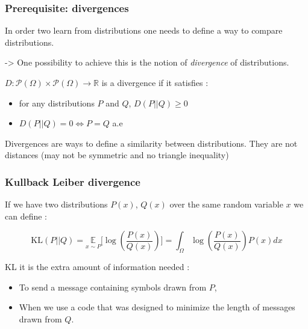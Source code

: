 \documentclass[french,9pt]{beamer}
\begin{document}


\begin{frame}
\frametitle{Prerequisite: divergences}

In order two learn from distributions one needs to define a way to compare distributions. 

-> One possibility to achieve this is the notion of \emph{divergence} of distributions.

\pause 

$D: \mathcal{P}(\Omega) \times  \mathcal{P}(\Omega) \rightarrow \mathbb{R}$ is a divergence if it satisfies :

\begin{itemize}
\item for any distributions $P$ and $Q$, $D(P||Q) \geq 0$
\item $D(P||Q) = 0 \iff P=Q $ a.e
\end{itemize}

\pause 
Divergences are ways to define a similarity between distributions. They are not distances (may not be symmetric and no triangle inequality)

\end{frame}

\begin{frame}
\frametitle{Kullback Leiber divergence}

If we have two distributions $P(x)$, $Q(x)$ over the same random variable $x$ we can define :

\begin{equation}
\label{kldiv}
\text{KL}(P||Q)=\underset{x \sim P}{\mathbb{E}}\big[\log(\frac{P(x)}{Q(x)})\big]=\int_{\Omega} \log(\frac{P(x)}{Q(x)}) P(x) dx
\end{equation}

KL it is the extra amount of information needed :

\begin{itemize}
\item To send a message containing symbols drawn from $P$,
\item When we use a code that was designed to minimize the length of messages drawn from $Q$.
\end{itemize}
  

\end{frame}
\end{document}
